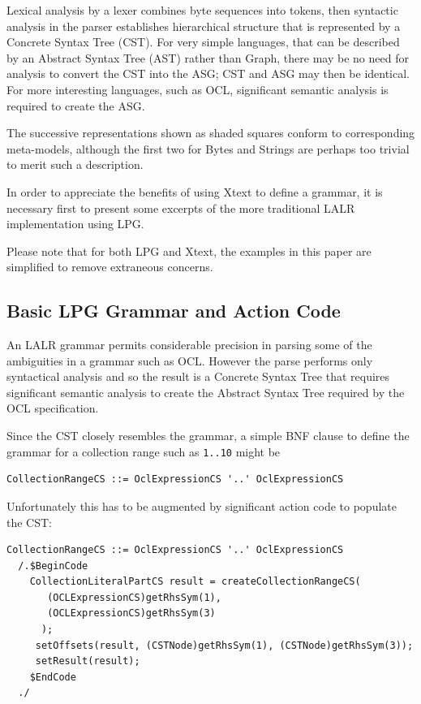 \documentclass[runningheads,a4paper]{llncs}
\begin{document}
Lexical analysis by a lexer combines byte sequences into tokens, then syntactic analysis in the parser establishes hierarchical structure that is represented by a Concrete Syntax Tree (CST). For very simple languages, that can be described by an Abstract Syntax Tree (AST) rather than Graph, there may be no need for analysis to convert the CST into the ASG; CST and ASG may then be identical.  For more interesting languages, such as OCL, significant semantic analysis is required to create the ASG.

The successive representations shown as shaded squares conform to corresponding meta-models, although the first two for Bytes and Strings are perhaps too trivial to merit such a description. 

In order to appreciate the benefits of using Xtext to define a grammar, it is necessary first to present some excerpts of the more traditional LALR\cite{dragon} implementation using LPG\cite{LPG}.

Please note that for both LPG and Xtext, the examples in this paper are simplified to remove extraneous concerns.

\subsection{Basic LPG Grammar and Action Code}

An LALR grammar permits considerable precision in parsing some of the ambiguities in a grammar such as OCL. However the parse performs only syntactical analysis and so the result is a Concrete Syntax Tree that requires significant semantic analysis to create the Abstract Syntax Tree required by the OCL specification.

Since the CST closely resembles the grammar, a simple BNF\cite{dragon} clause to define the grammar for a collection range such as \verb+1..10+ might be

{\small\begin{verbatim}
CollectionRangeCS ::= OclExpressionCS '..' OclExpressionCS
\end{verbatim}}

Unfortunately this has to be augmented by significant action code to populate the CST:

{\small\begin{verbatim}
CollectionRangeCS ::= OclExpressionCS '..' OclExpressionCS
  /.$BeginCode
    CollectionLiteralPartCS result = createCollectionRangeCS(
       (OCLExpressionCS)getRhsSym(1),
       (OCLExpressionCS)getRhsSym(3)
      );
     setOffsets(result, (CSTNode)getRhsSym(1), (CSTNode)getRhsSym(3));
     setResult(result);
    $EndCode
  ./
\end{verbatim}}
\end{document}
